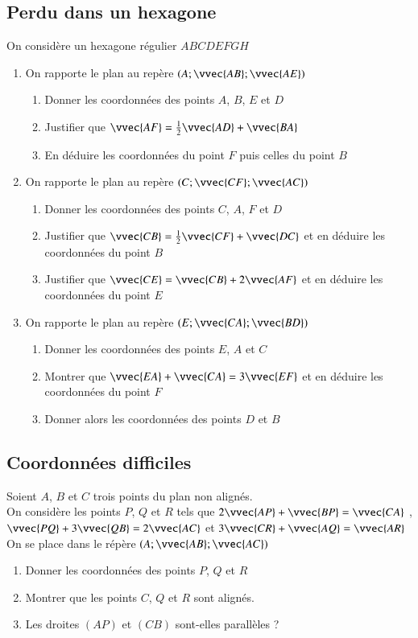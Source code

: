 \documentclass[oneside,12pt]{article}          %
\begin{document}
\subsection{Perdu dans un hexagone}
On considère un hexagone régulier $ABCDEFGH$
\begin{enumerate}
    \item On rapporte le plan au repère $(A;\vvec{AB};\vvec{AE})$
    \begin{enumerate}
        \item Donner les coordonnées des points $A$, $B$, $E$ et $D$
        \item Justifier que $\vvec{AF}=\frac{1}{2}\vvec{AD}+\vvec{BA}$
        \item En déduire les coordonnées du point $F$ puis celles du point $B$
    \end{enumerate}
    \item On rapporte le plan au repère $(C;\vvec{CF};\vvec{AC})$
    \begin{enumerate}
        \item Donner les coordonnées des points $C$, $A$, $F$ et $D$
        \item Justifier que $\vvec{CB}=\frac{1}{2}\vvec{CF}+\vvec{DC}$ et en déduire les coordonnées du point $B$
        \item Justifier que $\vvec{CE}=\vvec{CB}+2\vvec{AF}$ et en déduire les coordonnées du point $E$
    \end{enumerate}
    \item On rapporte le plan au repère $(E;\vvec{CA};\vvec{BD})$
    \begin{enumerate}
        \item Donner les coordonnées des points $E$, $A$ et $C$
        \item Montrer que $\vvec{EA}+\vvec{CA}=3\vvec{EF}$ et en déduire les coordonnées du point $F$
        \item Donner alors les coordonnées des points $D$ et $B$
    \end{enumerate}
\end{enumerate}



\subsection{Coordonnées difficiles}
Soient $A$, $B$ et $C$ trois points du plan non alignés.\\
On considère les points $P$, $Q$ et $R$ tels que $2\vvec{AP}+\vvec{BP}=\vvec{CA}$ , \quad $\vvec{PQ}+3\vvec{QB}=2\vvec{AC}$ et $3\vvec{CR}+\vvec{AQ}=\vvec{AR}$\\
On se place dans le répère $(A;\vvec{AB};\vvec{AC})$
\begin{enumerate}
    \item Donner les coordonnées des points $P$, $Q$ et $R$
    \item Montrer que les points $C$, $Q$ et $R$ sont alignés.
    \item Les droites $(AP)$ et $(CB)$ sont-elles parallèles ?
\end{enumerate}
\end{document}
